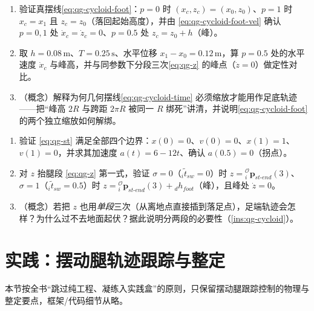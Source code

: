 \begin{practice}
\begin{enumerate}
  \item 验证真摆线\cref{eq:qg-cycloid-foot}：$p=0$ 时 $(x_c,z_c)=(x_0,z_0)$、$p=1$ 时 $x_c=x_1$ 且 $z_c=z_0$（落回起始高度），并由 \cref{eq:qg-cycloid-foot-vel} 确认 $p=0,1$ 处 $\dot x_c=\dot z_c=0$、$p=0.5$ 处 $z_c=z_0+h$（峰）。
  \item 取 $h=0.08\,\mathrm{m}$、$T=0.25\,\mathrm{s}$、水平位移 $x_1-x_0=0.12\,\mathrm{m}$，算 $p=0.5$ 处的水平速度 $\dot x_c$ 与峰高，并与同参数下分段三次\cref{eq:qg-z} 的峰点（$\dot z=0$）做定性对比。
  \item （概念）解释为何几何摆线\cref{eq:qg-cycloid-time} 必须缩放才能用作足底轨迹——把“峰高 $2R$ 与跨距 $2\pi R$ 被同一 $R$ 绑死”讲清，并说明\cref{eq:qg-cycloid-foot} 的两个独立缩放如何解绑。
\end{enumerate}
\end{practice}

\begin{practice}
\begin{enumerate}
  \item 验证 \cref{eq:qg-st} 满足全部四个边界：$x(0)=0$、$v(0)=0$、$x(1)=1$、$v(1)=0$，并求其加速度 $a(t)=6-12t$、确认 $a(0.5)=0$（拐点）。
  \item 对 $z$ 抬腿段 \cref{eq:qg-z} 第一式，验证 $\sigma=0$（${}_i\tilde t_{sw}=0$）时 $z={}_i^{\mathcal{O}}\boldsymbol{p}_{st\text{-}end}(3)$、$\sigma=1$（${}_i\tilde t_{sw}=0.5$）时 $z={}_i^{\mathcal{O}}\boldsymbol{p}_{st\text{-}end}(3)+{}_dh_{foot}$（峰），且峰处 $\dot z=0$。
  \item （概念）若把 $z$ 也用\emph{单段}三次（从离地点直接插到落足点），足端轨迹会怎样？为什么过不去地面起伏？据此说明分两段的必要性（\cref{ins:qg-cycloid}）。
\end{enumerate}
\end{practice}

\section{实践：摆动腿轨迹跟踪与整定}
\label{sec:qg-practice}

本节按全书“跳过纯工程、凝练入实践盒”的原则，只保留摆动腿跟踪控制的物理与整定要点，框架/代码细节从略。

